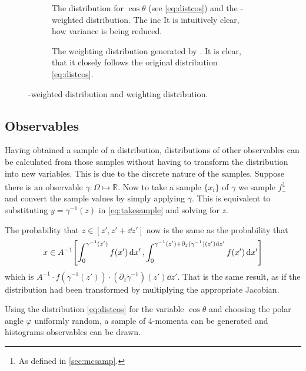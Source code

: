 \begin{figure}[ht]
  \centering
  \begin{subfigure}{.49\textwidth}
    \caption[The distribution for \(\cos\theta\), derived from the
    differential cross-section and the \vegas-weighted
    distribution]{\label{fig:vegasdist} The distribution for
      \(\cos\theta\) (see \cref{eq:distcos}) and the \vegas-weighted
      distribution. The inc It is intuitively clear, how variance is
      being reduced.}
  \end{subfigure}
  \begin{subfigure}{.49\textwidth}
    \caption[The weighting distribution generated by
    \vegas.]{\label{fig:vegasrho} The weighting distribution generated
      by \vegas. It is clear, that it closely follows the original
      distribution \cref{eq:distcos}.}
  \end{subfigure}
  \caption{\label{fig:vegas-weighting} \vegas-weighted distribution
    and weighting distribution.}
\end{figure}

\subsection{Observables}%
\label{sec:obs}

Having obtained a sample of a distribution, distributions of other
observables can be calculated from those samples without having to
transform the distribution into new variables. This is due to the
discrete nature of the samples. Suppose there is an observable
\(\gamma\colon\Omega\mapsto\mathbb{R}\). Now to take a sample
\(\{x_i\}\) of \(\gamma\) we sample \(f\)\footnote{As defined
  in \cref{sec:mcsamp}.} and convert the sample values by simply
applying \(\gamma\). This is equivalent to
substituting \(y=\gamma^{-1}(z)\) in \cref{eq:takesample} and solving
for \(z\).

The probability that \(z\in[z', z'+\dd{z'}]\) now is the same as the
probability that
\[\displaystyle x\in
  A^{-1}\qty[\int_{0}^{\gamma^{-1}(z')}f(x')\dd{x'},
  \int_{0}^{\gamma^{-1}(z')+\partial_z(\gamma^{-1})(z')\dd{z'}}f(x')\dd{x'}]\]
which is
\(A^{-1}\cdot f(\gamma^{-1}(z'))\cdot
(\partial_z\gamma^{-1})(z')\dd{z'}\). That is the same result, as if
the distribution had been transformed by multiplying the appropriate
Jacobian.

Using the distribution \cref{eq:distcos} for the variable
\(\cos\theta\) and choosing the polar angle \(\varphi\) uniformly
random, a sample of 4-momenta can be generated and histograms
observables can be drawn.

